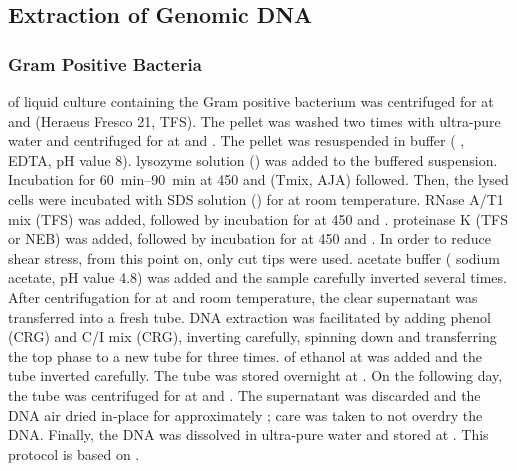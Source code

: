 \subsection{Extraction of Genomic DNA}
\subsubsection{Gram Positive Bacteria}
 of liquid culture containing the Gram positive bacterium was centrifuged for  at  and  (Heraeus Fresco 21, TFS). The pellet was washed two times with ultra-pure water and centrifuged for  at  and . The pellet was resuspended in   buffer ( ,  EDTA, pH value 8).  lysozyme solution () was added to the buffered suspension. Incubation for \SIrange{60}{90}{\minute} at \SI{450}{\rpm} and  (Tmix, AJA) followed. Then, the lysed cells were incubated with  SDS solution () for  at room temperature.  RNase A/T1 mix (TFS) was added, followed by incubation for  at \SI{450}{\rpm} and .  proteinase K (TFS or NEB) was added, followed by incubation for  at \SI{450}{\rpm} and . In order to reduce shear stress, from this point on, only cut tips were used.  acetate buffer ( sodium acetate, pH value \num{4.8}) was added and the sample carefully inverted several times. After centrifugation for  at  and room temperature, the clear supernatant was transferred into a fresh  tube. DNA extraction was facilitated by adding  phenol (CRG) and  C/I mix (CRG), inverting carefully, spinning down and transferring the top phase to a new tube for three times.  of  ethanol at  was added and the tube inverted carefully. The tube was stored overnight at . On the following day, the tube was centrifuged for  at  and . The supernatant was discarded and the DNA air dried in-place for approximately ; care was taken to not overdry the DNA. Finally, the DNA was dissolved in  ultra-pure water and stored at . This protocol is based on \cite{Saha2005}.


